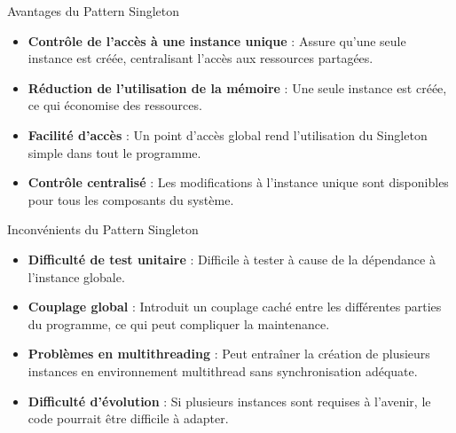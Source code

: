 \documentclass[aspectratio=169]{beamer}
\begin{document}
  \begin{frame}{Avantages du Pattern Singleton}
      \begin{itemize}
          \item \textbf{Contrôle de l'accès à une instance unique} : Assure qu'une seule instance est créée, centralisant l'accès aux ressources partagées.
          \item \textbf{Réduction de l'utilisation de la mémoire} : Une seule instance est créée, ce qui économise des ressources.
          \item \textbf{Facilité d'accès} : Un point d'accès global rend l'utilisation du Singleton simple dans tout le programme.
          \item \textbf{Contrôle centralisé} : Les modifications à l'instance unique sont disponibles pour tous les composants du système.
      \end{itemize}
  \end{frame}

  \begin{frame}{Inconvénients du Pattern Singleton}
      \begin{itemize}
          \item \textbf{Difficulté de test unitaire} : Difficile à tester à cause de la dépendance à l'instance globale.
          \item \textbf{Couplage global} : Introduit un couplage caché entre les différentes parties du programme, ce qui peut compliquer la maintenance.
          \item \textbf{Problèmes en multithreading} : Peut entraîner la création de plusieurs instances en environnement multithread sans synchronisation adéquate.
          \item \textbf{Difficulté d'évolution} : Si plusieurs instances sont requises à l'avenir, le code pourrait être difficile à adapter.
      \end{itemize}
  \end{frame}
\end{document}
